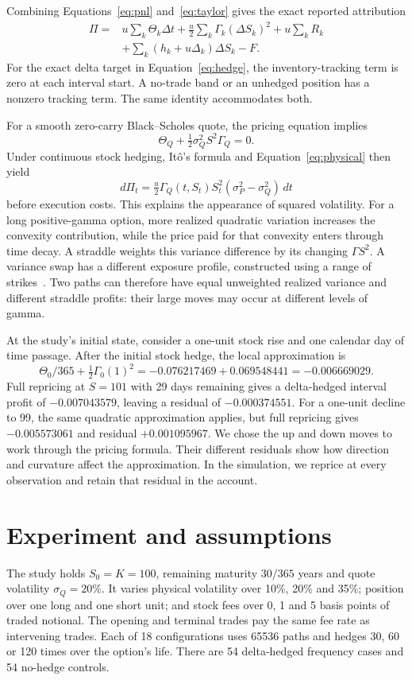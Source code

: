\documentclass[8pt]{strategynet-journal}
\begin{document}
\begin{SNcolumns}
Combining Equations~\eqref{eq:pnl} and~\eqref{eq:taylor} gives the exact reported
attribution
\begin{align}
 \Pi={}&u\sum_k\Theta_k\Delta t
       +\tfrac u 2\sum_k\Gamma_k(\Delta S_k)^2
       +u\sum_k R_k\nonumber\\
       &+\sum_k(h_k+u\Delta_k)\Delta S_k-F.
 \label{eq:attribution}
\end{align}
For the exact delta target in Equation~\eqref{eq:hedge}, the inventory-tracking
term is zero at each interval start. A no-trade band or an unhedged position
has a nonzero tracking term. The same identity accommodates both.

For a smooth zero-carry Black--Scholes quote, the pricing equation implies
\[
 \Theta_Q+\tfrac 12\sigma_Q^2 S^2\Gamma_Q=0.
\]
Under continuous stock hedging, It\^o's formula and
Equation~\eqref{eq:physical} then yield
\begin{equation}
 d\Pi_t=\tfrac u 2\Gamma_Q(t, S_t)S_t^2
                   (\sigma_P^2-\sigma_Q^2)\, dt
 \label{eq:variance}
\end{equation}
before execution costs. This explains the appearance of squared volatility.
For a long positive-gamma option, more realized quadratic variation increases
the convexity contribution, while the price paid for that convexity enters
through time decay. A straddle weights this variance difference by its changing
$\Gamma S^2$. A variance swap has a different exposure profile, constructed
using a range of strikes~\cite{derman}. Two paths can therefore have equal unweighted realized variance and different
straddle profits: their large moves may occur at different levels of gamma.

At the study's initial state, consider a one-unit stock rise and one calendar
day of time passage. After the initial stock hedge, the local approximation is
\[
 \Theta_0/365+\tfrac 12\Gamma_0(1)^2
 =-0.076217469+0.069548441=-0.006669029.
\]
Full repricing at $S=101$ with 29 days remaining gives a delta-hedged interval
profit of $-0.007043579$, leaving a residual of $-0.000374551$.
For a one-unit decline to 99, the same quadratic approximation applies, but full
repricing gives $-0.005573061$ and residual $+0.001095967$.
We chose the up and down moves to work through the pricing formula. Their
different residuals show how direction and curvature affect the approximation.
In the simulation, we reprice at every observation and retain that residual in
the account.

\section{Experiment and assumptions}
The study holds $S_0=K=100$, remaining maturity $30/365$ years and quote
volatility $\sigma_Q=20\%$. It varies physical volatility over 10\%, 20\% and 35\%;
position over one long and one short unit; and stock fees over 0, 1 and 5 basis
points of traded notional. The opening and terminal trades pay the same fee
rate as intervening trades. Each of 18 configurations uses 65536 paths and
hedges 30, 60 or 120 times over the option's life. There are 54 delta-hedged
frequency cases and 54 no-hedge controls.


\end{SNcolumns}
\end{document}
